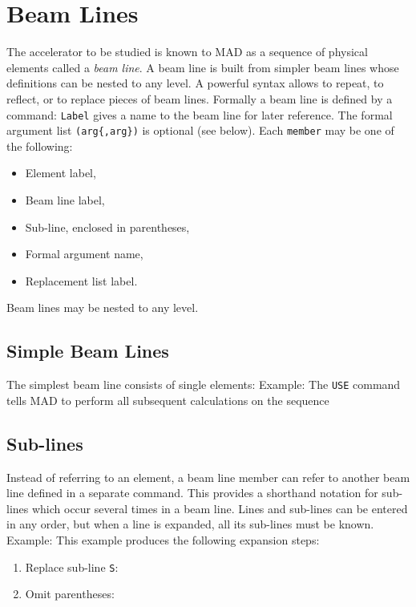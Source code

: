 \section{Beam Lines}
\label{S-LINE}
The accelerator to be studied is known to MAD
as a sequence of physical elements called a {\em beam line}.
A beam line is built from simpler beam lines whose definitions
can be nested to any level.
A powerful syntax allows to repeat, to reflect, or to replace
pieces of beam lines.
Formally a beam line is defined by a  command:
{\tt Label} gives a name to the beam line for later reference.
The formal argument list {\tt (arg\{,arg\})} is optional (see below).
Each {\tt member} may be one of the following:
\begin{itemize}
\item Element label,
\item Beam line label,
\item Sub-line, enclosed in parentheses,
\item Formal argument name,
\item Replacement list label.
\end{itemize}
Beam lines may be nested to any level.
 
\subsection{Simple Beam Lines}
The simplest beam line consists of single elements:
Example:
The {\tt USE} command tells MAD to perform all subsequent
calculations on the sequence
 
\subsection{Sub-lines}
Instead of referring to an element,
a beam line member can refer to another beam line
defined in a separate command.
This provides a shorthand notation for sub-lines which occur
several times in a beam line.
Lines and sub-lines can be entered in any order,
but when a line is expanded, all its sub-lines must be known.
Example:
This example produces the following expansion steps:
\begin{enumerate}
\item Replace sub-line {\tt S}:
\item Omit parentheses:
\end{enumerate}
 
